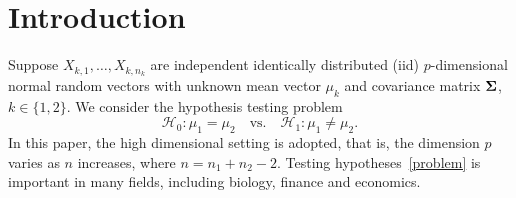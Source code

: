 \documentclass[times,sort&compress,3p]{elsarticle}
\theoremstyle{plain}
\theoremstyle{definition}
\theoremstyle{remark}
\begin{document}



\section{Introduction}

Suppose $X_{k,1},\ldots,X_{k,n_k}$  are independent identically distributed (iid) $p$-dimensional normal random vectors with unknown mean vector $\mu_k$ and covariance matrix $\boldsymbol{\Sigma}$, $k\in \{1,2\}$. We consider the hypothesis testing problem
\begin{equation}\label{problem}
    \mathcal{H}_0:\mu_1=\mu_2\quad \textrm{vs.}\quad \mathcal{H}_1:\mu_1\neq \mu_2.
\end{equation}
 In this paper, {the} high dimensional setting is adopted, that is, the dimension $p$ varies as $n$ increases, where $n=n_1+n_2-2$.
Testing hypotheses~\eqref{problem} is important in many fields, including biology, finance and economics.
\end{document}
